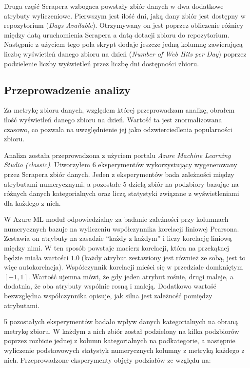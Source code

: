 Druga część Scrapera wzbogaca powstały zbiór danych w dwa dodatkowe atrybuty wyliczeniowe.
Pierwszym jest ilość dni, jaką dany zbiór jest dostępny w repozytorium (\emph{Days Available}).
Otrzymywany on jest poprzez obliczenie różnicy między datą uruchomienia Scrapera a datą dotacji zbioru do repozytorium.
Następnie z użyciem tego pola skrypt dodaje jeszcze jedną kolumnę zawierającą liczbę wyświetleń danego zbioru na dzień (\emph{Number of Web Hits per Day}) poprzez podzielenie liczby wyświetleń przez liczbę dni dostępności zbioru.

\subsection{Przeprowadzenie analizy}

Za metrykę zbioru danych, względem której przeprowadzam analizę, obrałem ilość wyświetleń danego zbioru na dzień.
Wartość ta jest znormalizowana czasowo, co pozwala na uwzględnienie jej jako odzwierciedlenia popularności zbioru.

Analiza została przeprowadzona z użyciem portalu \emph{Azure Machine Learning Studio (classic)}.
Utworzyłem 6 eksperymentów wykorzystujący wygenerowany przez Scrapera zbiór danych.
Jeden z eksperymentów bada zależności między atrybutami numerycznymi, a pozostałe 5 dzielą zbiór na podzbiory bazując na różnych danych kategorialnych oraz liczą statystyki związane z wyświetleniami dla każdego z nich.

W Azure ML moduł odpowiedzialny za badanie zależności przy kolumnach numerycznych bazuje na wyliczeniu współczynnika korelacji liniowej Pearsona.
Zestawia on atrybuty na zasadzie ``każdy z każdym'' i liczy korelację liniową między nimi.
W ten sposób powstaje macierz korelacji, która na przekątnej będzie miała wartości \( 1.0 \) (każdy atrybut zestawiony jest również ze sobą, jest to więc autokorelacja).
Współczynnik korelacji mieści się w przedziale domkniętym \( [-1, 1] \).
Wartość ujemna mówi, że gdy jeden atrybut rośnie, drugi maleje, a dodatnia, że oba atrybuty wspólnie rosną i maleją.
Dodatkowo wartość bezwzględna współczynnika opisuje, jak silna jest zależność pomiędzy atrybutami.

5 pozostałych eksperymentów badało wpływ danych kategorialnych na obraną metrykę zbioru.
W każdym z nich zbiór został podzielony na kilka podzbiorów poprzez rozbicie jednej z kolumn kategorialnych na podkategorie, a następnie wyliczenie podstawowych statystyk numerycznych kolumny z metryką każdego z nich.
Przeprowadzone eksperymenty objęły podziałów ze względu na:

